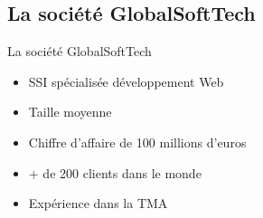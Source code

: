 \subsection{La société GlobalSoftTech}
	\begin{frame}{La société GlobalSoftTech}
		\begin{itemize}
			\item SSI spécialisée développement Web
			\item Taille moyenne
			\item Chiffre d'affaire de 100 millions d'euros
			\item + de 200 clients dans le monde
			\item Expérience dans la TMA
		\end{itemize}
	\end{frame}